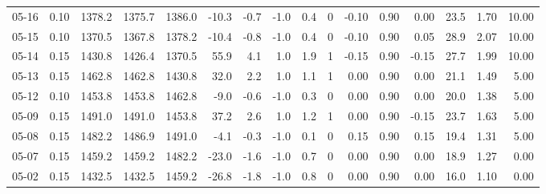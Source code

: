 \begin{threeparttable}
{\begin{tabular}{lrrrrrrrrrrrrrrr}
  05-16 &     0.10 & 1378.2 & 1375.7 & 1386.0 &      -10.3 &           -0.7 &                     -1.0 &                 0.4 &              0 &      -0.10 &      0.90 &           0.00 &             23.5 &            1.70 &                  10.00 \\
  05-15 &     0.10 & 1370.5 & 1367.8 & 1378.2 &      -10.4 &           -0.8 &                     -1.0 &                 0.4 &              0 &      -0.10 &      0.90 &           0.05 &             28.9 &            2.07 &                  10.00 \\
  05-14 &     0.15 & 1430.8 & 1426.4 & 1370.5 &       55.9 &            4.1 &                      1.0 &                 1.9 &              1 &      -0.15 &      0.90 &          -0.15 &             27.7 &            1.99 &                  10.00 \\
  05-13 &     0.15 & 1462.8 & 1462.8 & 1430.8 &       32.0 &            2.2 &                      1.0 &                 1.1 &              1 &       0.00 &      0.90 &           0.00 &             21.1 &            1.49 &                   5.00 \\
  05-12 &     0.10 & 1453.8 & 1453.8 & 1462.8 &       -9.0 &           -0.6 &                     -1.0 &                 0.3 &              0 &       0.00 &      0.90 &           0.00 &             20.0 &            1.38 &                   5.00 \\
  05-09 &     0.15 & 1491.0 & 1491.0 & 1453.8 &       37.2 &            2.6 &                      1.0 &                 1.2 &              1 &       0.00 &      0.90 &          -0.15 &             23.7 &            1.63 &                   5.00 \\
  05-08 &     0.15 & 1482.2 & 1486.9 & 1491.0 &       -4.1 &           -0.3 &                     -1.0 &                 0.1 &              0 &       0.15 &      0.90 &           0.15 &             19.4 &            1.31 &                   5.00 \\
  05-07 &     0.15 & 1459.2 & 1459.2 & 1482.2 &      -23.0 &           -1.6 &                     -1.0 &                 0.7 &              0 &       0.00 &      0.90 &           0.00 &             18.9 &            1.27 &                   0.00 \\
  05-02 &     0.15 & 1432.5 & 1432.5 & 1459.2 &      -26.8 &           -1.8 &                     -1.0 &                 0.8 &              0 &       0.00 &      0.90 &           0.00 &             16.0 &            1.10 &                   0.00 \\

\end{tabular}}
\end{threeparttable}
